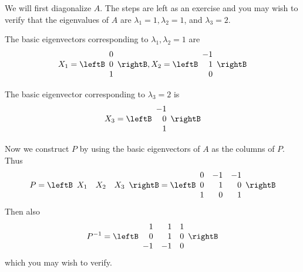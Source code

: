 \begin{solution}
We will first diagonalize $A$. The steps are left as an exercise and
you may wish to verify that the eigenvalues of $A$ are $\lambda_1 =1,
\lambda_2=1$, and $\lambda_3=2$.

The basic eigenvectors corresponding to $\lambda_1, \lambda_2 = 1$ are
\begin{equation*}
X_1 = \leftB
\begin{array}{r}
0 \\
0 \\
1
\end{array}
\rightB ,
X_2
=
\leftB
\begin{array}{r}
-1 \\
1 \\
0
\end{array}
\rightB
\end{equation*}

The basic eigenvector corresponding to $\lambda_3 = 2$ is
\begin{equation*}
X_3
=
\leftB
\begin{array}{r}
-1 \\
0 \\
1
\end{array}
\rightB 
\end{equation*}

Now we construct $P$ by using the basic eigenvectors of $A$ as the columns of $P$.
Thus
\begin{equation*}
P=
\leftB
\begin{array}{rrr}
X_1 & X_2 & X_3
\end{array}
\rightB
=
\leftB
\begin{array}{rrr}
0 & -1 & -1 \\
0 & 1 & 0 \\
1 & 0 & 1
\end{array}
\rightB
\end{equation*}
Then also
\begin{equation*}
P^{-1}=\leftB
\begin{array}{rrr}
1 & 1 & 1 \\
0 & 1 & 0 \\
-1 & -1 & 0
\end{array}
\rightB
\end{equation*}
which you may wish to verify.


\end{solution}
